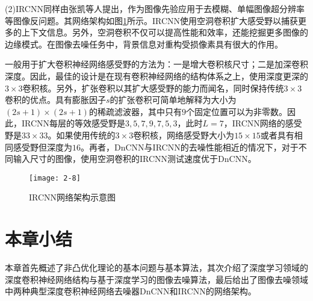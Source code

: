 (2)IRCNN同样由张凯等人提出，作为图像先验应用于去模糊、单幅图像超分辨率等图像反问题。其网络架构如图\ref{fig:2-8}所示\supercite{ZhangKai}。IRCNN使用空洞卷积扩大感受野以捕获更多的上下文信息。另外，空洞卷积不仅可以提高性能和效率，还能挖掘更多图像的边缘模式。在图像去噪任务中，背景信息对重构受损像素具有很大的作用。

一般用于扩大卷积神经网络感受野的方法为：一是增大卷积核尺寸；二是加深卷积深度。因此，最佳的设计是在现有卷积神经网络的结构体系之上，使用深度更深的$3\times3$卷积核。另外，扩张卷积以其扩大感受野的能力而闻名，同时保持传统$3\times3$卷积的优点。具有膨胀因子$s$的扩张卷积可简单地解释为大小为$(2s+1)\times(2s+1)$的稀疏滤波器，其中只有$9$个固定位置可以为非零数。因此，IRCNN每层的等效感受野是$3,5,7,9,7,5,3$，此时$L=7$，IRCNN网络的感受野是$33\times33$。如果使用传统的$3\times3$卷积核，网络感受野大小为$15\times15$或者具有相同感受野但深度为$16$。再者，DnCNN与IRCNN的去噪性能相近的情况下，对于不同输入尺寸的图像，使用空洞卷积的IRCNN测试速度优于DnCNN。
\begin{figure}[!htbp]
	\centering
	\texttt{[image: 2-8]}
	\caption{IRCNN网络架构示意图}\label{fig:2-8}
\end{figure}

\section{本章小结}
本章首先概述了非凸优化理论的基本问题与基本算法，其次介绍了深度学习领域的深度卷积神经网络结构与基于深度学习的图像去噪算法，最后给出了图像去噪领域中两种典型深度卷积神经网络去噪器DnCNN和IRCNN的网络架构。


